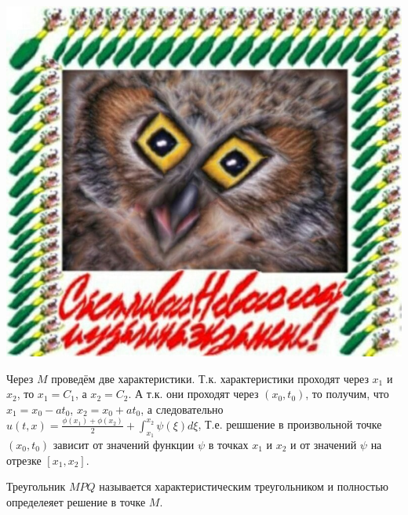 \documentclass[../main.tex]{subfiles}
\begin{document}
\includegraphics[scale=0.5]{example.jpg}

Через $M$ проведём две характеристики. Т.к. характеристики проходят через
$x_1$ и $x_2$, то $x_1 = C_1$, а $x_2 = C_2$.
А т.к. они проходят через $(x_0, t_0)$, то получим, что $x_1 = x_0 -at_0$, $x_2 = x_0 + at_0$,
а следовательно $u(t, x) = \frac{\phi(x_1) + \phi(x_2)}{2} + \int_{x_1}^{x_2}\psi(\xi)d\xi$,
Т.е. решшение в произвольной точке $(x_0, t_0)$ зависит от значений функции $\psi$
в точках $x_1$ и $x_2$ и от значений $\psi$ на отрезке $[x_1, x_2]$.

Треугольник $MPQ$ называется характеристическим треугольником и полностью определеяет решение в точке $M$.
\end{document}
